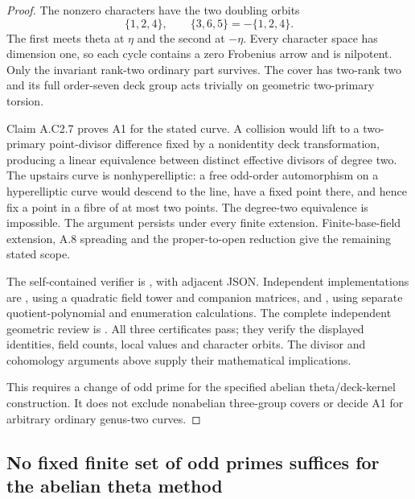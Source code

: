 \begin{proof}
The nonzero characters have the two doubling orbits
\[
                    \{1,2,4\},\qquad
                    \{3,6,5\}=-\{1,2,4\}.
\]
The first meets theta at $\eta$ and the second at $-\eta$.
Every character space has dimension one, so each cycle
contains a zero Frobenius arrow and is nilpotent.
Only the invariant rank-two ordinary part survives.
The cover has two-rank two and its full order-seven deck
group acts trivially on geometric two-primary torsion.

Claim A.C2.7 proves A1 for the stated curve. A collision would
lift to a two-primary point-divisor difference fixed by a
nonidentity deck transformation, producing a linear
equivalence between distinct effective divisors of degree two.
The upstairs curve is nonhyperelliptic: a free odd-order
automorphism on a hyperelliptic curve would descend to the
line, have a fixed point there, and hence fix a point in
a fibre of at most two points. The degree-two equivalence
is impossible. The argument persists under every finite
extension. Finite-base-field extension, A.8 spreading and
the proper-to-open reduction give the remaining stated scope.

The self-contained verifier is
, with adjacent JSON.
Independent implementations are
, using a quadratic
field tower and companion matrices, and
, using separate
quotient-polynomial and enumeration calculations.
The complete independent geometric review is
.
All three certificates pass; they verify the displayed
identities, field counts, local values and character orbits.
The divisor and cohomology arguments above supply their
mathematical implications.

This requires a change of odd prime for the specified
abelian theta/deck-kernel construction. It does not exclude
nonabelian three-group covers or decide A1 for arbitrary
ordinary genus-two curves.
\end{proof}

\subsection{No fixed finite set of odd primes suffices for the abelian theta method}

